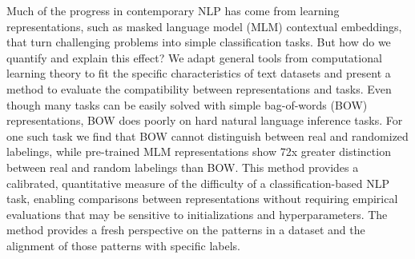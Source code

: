 Much of the progress in contemporary NLP has come from learning representations, such as masked language model (MLM) contextual embeddings, that turn challenging problems into simple classification tasks. But how do we quantify and explain this effect? We adapt general tools from computational learning theory to fit the specific characteristics of text datasets and present a method to evaluate the compatibility between representations and tasks. Even though many tasks can be easily solved with simple bag-of-words (BOW) representations, BOW does poorly on hard natural language inference tasks. For one such task we find that BOW cannot distinguish between real and randomized labelings, while pre-trained MLM representations show 72x greater distinction between real and random labelings than BOW. This method provides a calibrated, quantitative measure of the difficulty of a classification-based NLP task, enabling comparisons between representations without requiring empirical evaluations that may be sensitive to initializations and hyperparameters. The method provides a fresh perspective on the patterns in a dataset and the alignment of those patterns with specific labels.
